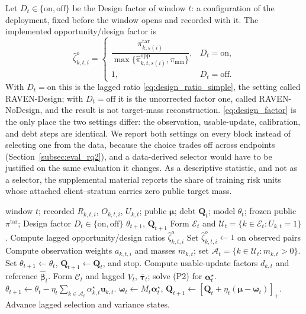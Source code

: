 \documentclass[letterpaper,journal]{IEEEtran}
\begin{document}
Let $D_t\in\{\mathrm{on},\mathrm{off}\}$ be the Design factor of window $t$:
a configuration of the deployment, fixed before the window opens and recorded
with it.  The implemented opportunity/design factor is
\begin{equation}
\widehat\zeta^{o}_{k,t,i}
=
\begin{cases}
\dfrac{\pi^{\mathrm{tar}}_{k,s(i)}}
{\max\{\widehat\pi^{\mathrm{opp}}_{k,t,s(i)},\pi_{\min}\}}, & D_t=\mathrm{on},\\[1.5mm]
1, & D_t=\mathrm{off}.
\end{cases}
\label{eq:design_factor}
\end{equation}
With $D_t=\mathrm{on}$ this is the lagged ratio
\eqref{eq:design_ratio_simple}, the setting called RAVEN-Design; with
$D_t=\mathrm{off}$ it is the uncorrected factor one, called RAVEN-NoDesign,
and the result is not target-mass reconstruction.
\eqref{eq:design_factor} is the only place the two settings differ: the
observation, usable-update, calibration, and debt steps are identical.
We report both settings on every block instead of selecting one from the
data, because the choice trades off across endpoints
(Section~\ref{subsec:eval_rq2}), and a data-derived selector would have to be
justified on the same evaluation it changes.
As a descriptive statistic, and not as a selector, the supplemental material
reports the share of training risk units whose attached client--stratum
carries zero public target mass.

\begin{algorithm}[t]
\caption{Window-close RAVEN-MCS with the Design factor as an explicit configuration}
\label{alg:window_close}
\begin{algorithmic}[1]
\REQUIRE window $t$; recorded $R_{k,t,i}$, $O_{k,t,i}$, $U_{k,t}$;
public $\boldsymbol\mu$; debt $\mathbf{Q}_t$; model $\theta_t$;
frozen public $\pi^{\mathrm{tar}}$; Design factor $D_t\in\{\mathrm{on},\mathrm{off}\}$
\ENSURE $\theta_{t+1}$, $\mathbf{Q}_{t+1}$
\STATE Form $\mathcal{E}_t$ and
$\mathcal{U}_t=\{k\in\mathcal{E}_t:U_{k,t}=1\}$.
\STATE Compute lagged opportunity/design ratios
$\widehat\zeta^{o}_{k,t,i}$ 
\ELSE
\STATE Set $\widehat\zeta^{o}_{k,t,i}\leftarrow 1$ on observed pairs 
\ENDIF
\STATE Compute observation weights $a_{k,t,i}$ and masses $m_{k,t}$;
set $\mathcal{A}_t=\{k\in\mathcal{U}_t:m_{k,t}>0\}$.
\STATE Set $\theta_{t+1}\leftarrow\theta_t$,
$\mathbf{Q}_{t+1}\leftarrow\mathbf{Q}_t$, and stop.
\ELSE
\STATE Compute usable-update factors $d_{k,t}$ and reference
$\widehat{\boldsymbol\beta}_t$.
\STATE Form $\mathcal{C}_t$ and lagged $V_t$,
$\overline{\boldsymbol\tau}_t$; solve (P2) for
$\boldsymbol\alpha_t^\star$.
\STATE $\theta_{t+1}\leftarrow\theta_t
-\eta_t\sum_{k\in\mathcal{A}_t}\alpha^\star_{k,t}\mathbf{u}_{k,t}$.
\STATE $\boldsymbol\omega_t\leftarrow M_t\boldsymbol\alpha_t^\star$,
$\mathbf{Q}_{t+1}\leftarrow
[\mathbf{Q}_t+\eta_t(\boldsymbol\mu-\boldsymbol\omega_t)]_+$.
\STATE Advance lagged selection and variance states.
\ENDIF
\end{algorithmic}
\end{algorithm}
\end{document}
